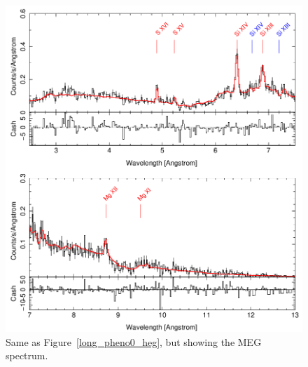 \begin{figure}[t]
    \centering
        \includegraphics[width = \linewidth]{Chapters/Figures/long_pheno0_meg.png}
        \caption{Same as Figure~\ref{long_pheno0_heg}, but showing the MEG spectrum.}
    \label{long_pheno0_meg}
\end{figure}





